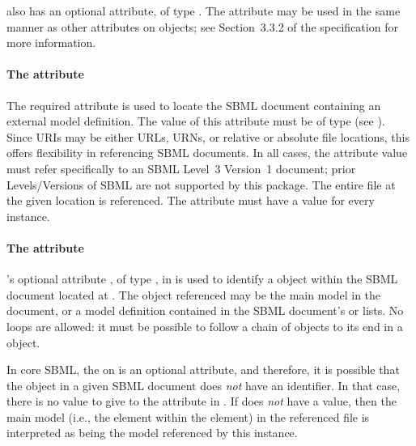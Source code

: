 \ExternalModelDefinition also has an optional  attribute, of
type .  The  attribute may be used
in the same manner as other  attributes on \sbmlthreecore
objects; see Section~3.3.2 of the \sbmlthreecore
specification for more information.


\paragraph{The \fixttspace{} attribute}

The required attribute  is used to locate the SBML
document containing an external model definition.  The value of this
attribute must be of type  (see ).
Since URIs may be either URLs, URNs, or relative or absolute file
locations, this offers flexibility in referencing SBML documents.  In
all cases, the  attribute value must refer specifically to
an SBML Level~3 Version~1 document; prior Levels/Versions of SBML are
not supported by this package.  The entire file at the given location is
referenced.  The  attribute must have a value for every
\ExternalModelDefinition instance.

\paragraph{The \fixttspace{} attribute}

\ExternalModelDefinition's optional attribute , of type
, in is used to identify a \Model object within the
SBML document located at .  The object referenced may be
the main model in the document, or a model definition contained in the
SBML document's  or
 lists.  No loops are allowed: it
must be possible to follow a chain of \ExternalModelDefinition objects
to its end in a \Model object.

In core SBML, the  on \Model is an optional attribute, and
therefore, it is possible that the \Model object in a given SBML
document does \emph{not} have an identifier.  In that case, there is no
value to give to the  attribute in
\ExternalModelDefinition.  If  does \emph{not} have a
value, then the main model (i.e., the  element within the
 element) in the referenced file is interpreted as being
the model referenced by this \ExternalModelDefinition instance.

